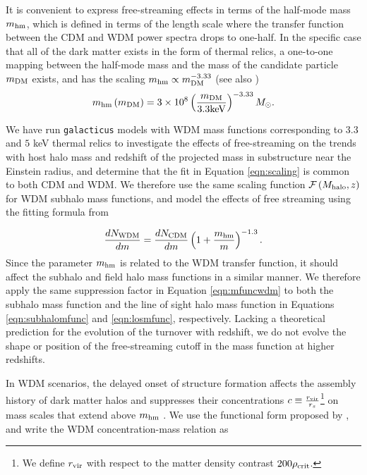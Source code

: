 It is convenient to express free-streaming effects in terms of the half-mode mass ${m_{\rm{hm}}}$, which is defined in terms of the length scale where the transfer function between the CDM and WDM power spectra drops to one-half. In the specific case that all of the dark matter exists in the form of thermal relics, a one-to-one mapping between the half-mode mass and the mass of the  candidate particle $m_{\rm{DM}}$ exists, and has the scaling ${m_{\rm{hm}}} \propto m_{\rm{DM}}^{-3.33}$ \citep{Schneider++12} (see also \citet{BlandfordNarayan86})
\begin{equation}
\label{eqn:masskev}
m_{\rm{hm}}\left(m_{\rm{DM}}\right) = 3\times 10^{8} \left(\frac{m_{\rm{DM}}}{\rm{3.3keV}}\right)^{-3.33} {M_{\odot}}.
\end{equation}

We have run {\tt{galacticus}} models \citep{Benson++13} with WDM mass functions corresponding to $3.3$ and $5$ keV thermal relics to investigate the effects of free-streaming on the trends with host halo mass and redshift of the projected mass in substructure near the Einstein radius, and determine that the fit in Equation \ref{eqn:scaling} is common to both CDM and WDM. We therefore use the same scaling function $\mathcal{F} \left(M_{\rm{halo}}, z\right)$ for WDM subhalo mass functions, and model the effects of free streaming using the fitting formula from \citep{Lovell++14}

\begin{equation}
\label{eqn:mfuncwdm}
\frac{dN_{\rm{WDM}}}{dm} = \frac{dN_{\rm{CDM}}}{dm} \left(1+\frac{m_{\rm{hm}}}{m} \right)^{-1.3}.
\end{equation}
Since the parameter ${m_{\rm{hm}}}$ is related to the WDM transfer function, it should affect the subhalo and field halo mass functions in a similar manner. We therefore apply the same suppression factor in Equation \ref{eqn:mfuncwdm} to both the subhalo mass function and the line of sight halo mass function in Equations \ref{eqn:subhalomfunc}  and \ref{eqn:losmfunc}, respectively. Lacking a theoretical prediction for the evolution of the turnover with redshift, we do not evolve the shape or position of the free-streaming cutoff in the mass function at higher redshifts. 

In WDM scenarios, the delayed onset of structure formation affects the assembly history of dark matter halos and suppresses their concentrations $c \equiv \frac{r_{\rm{vir}}}{r_s}$\footnote{We define $r_{\rm{vir}}$ with respect to the matter density contrast $200 \rho_{\rm{crit}}$. } on mass scales that extend above ${m_{\rm{hm}}}$ \citep{Schneider++12, Bose++16}. We use the functional form proposed by \citep{Bose++16}, and write the WDM concentration-mass relation as


